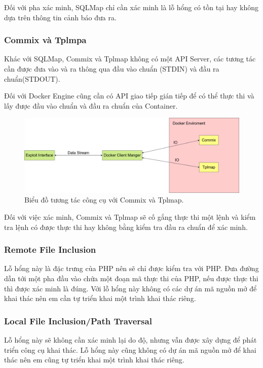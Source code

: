 \documentclass[./../main.tex]{subfiles}
\begin{document}
Đối với pha xác minh, SQLMap chỉ cần xác minh là lỗ hổng có tồn tại
hay không dựa trên thông tin cảnh báo đưa ra.
\subsubsection{Commix và Tplmpa}
Khác với SQLMap, Commix và Tplmap không có một API Server, các tương
tác cần được đưa vào và ra thông qua đầu vào chuẩn (STDIN) và đầu ra
chuẩn(STDOUT).

Đối với Docker Engine cũng cần có API giao tiếp gián tiếp để có thể thực
thi và lấy được đầu vào chuẩn và đầu ra chuẩn của Container.


\begin{figure}[H]
	\includegraphics[width=\linewidth]{./images/DockerIO.png}
	\caption{Biểu đồ tương tác công cụ với Commix và Tplmap.}
	\label{fig:commix_tplmap}
\end{figure}

Đối với việc xác minh, Commix và Tplmap sẽ cố gắng thực thi một lệnh
và kiểm tra lệnh có được thực thi hay không bằng kiểm tra đầu ra chuẩn
để xác minh.

\subsubsection{Remote File Inclusion}
Lỗ hổng này là đặc trưng của PHP nên sẽ chỉ được kiểm tra với PHP. Đưa
đường dẫn tới một pha đầu vào chứa một đoạn mã thực thi của PHP, nếu
được thực thi thì được xác minh là đúng. Với lỗ hổng này không có các
dự án mã nguồn mở để khai thác nên em cần tự triển khai một trình khai
thác riêng.
\subsubsection{Local File Inclusion/Path Traversal}
Lỗ hổng này sẽ không cần xác minh lại do độ, nhưng vẫn được xây dựng để
phát triển công cụ khai thác. Lỗ hổng này cũng không có dự án mã nguồn
mở để khai thác nên em cũng tự triển khai một trình khai thác riêng.
\end{document}
